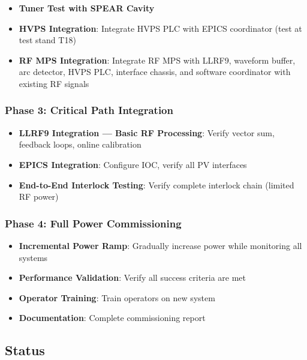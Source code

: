 \begin{itemize}
\tightlist
\item
  \textbf{Tuner Test with SPEAR Cavity}
\item
  \textbf{HVPS Integration}: Integrate HVPS PLC with EPICS coordinator (test at test stand T18)
\item
  \textbf{RF MPS Integration}: Integrate RF MPS with LLRF9, waveform buffer, arc detector, HVPS PLC, interface chassis, and software coordinator with existing RF signals
\end{itemize}

\subsubsection{Phase 3: Critical Path Integration}\label{phase-3-critical-path-integration}

\begin{itemize}
\tightlist
\item
  \textbf{LLRF9 Integration --- Basic RF Processing}: Verify vector sum, feedback loops, online calibration
\item
  \textbf{EPICS Integration}: Configure IOC, verify all PV interfaces
\item
  \textbf{End-to-End Interlock Testing}: Verify complete interlock chain (limited RF power)
\end{itemize}

\subsubsection{Phase 4: Full Power Commissioning}\label{phase-4-full-power-commissioning}

\begin{itemize}
\tightlist
\item
  \textbf{Incremental Power Ramp}: Gradually increase power while monitoring all systems
\item
  \textbf{Performance Validation}: Verify all success criteria are met
\item
  \textbf{Operator Training}: Train operators on new system
\item
  \textbf{Documentation}: Complete commissioning report
\end{itemize}

\subsection{Status}\label{status}

